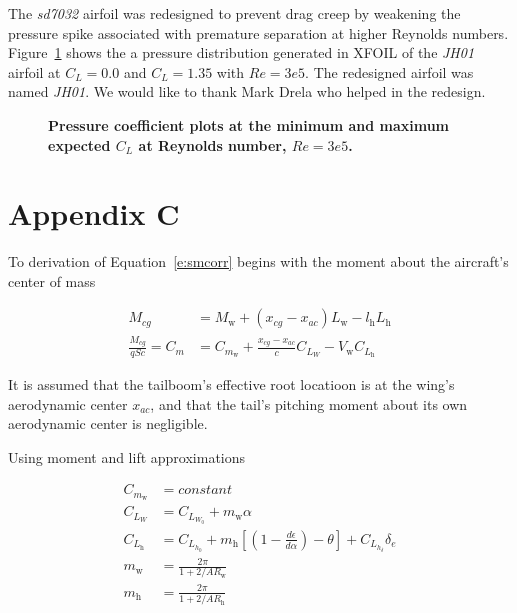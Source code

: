 \documentclass[]{aiaa-tc}%
\begin{document}
The \emph{sd7032} airfoil was redesigned to prevent drag creep by weakening the pressure spike associated with premature separation at higher Reynolds numbers.  
Figure~\ref{f:jhcps} shows the a pressure distribution generated in XFOIL of the \emph{JH01} airfoil at $C_L=0.0$ and $C_L=1.35$ with $Re=3e5$.
The redesigned airfoil was named \emph{JH01}. We would like to thank Mark Drela who helped in the redesign.

\begin{figure}[H]
 \begin{subfigmatrix}{2}%
 \end{subfigmatrix}
 \caption{\textbf{ Pressure coefficient plots at the minimum and maximum expected $C_L$ at Reynolds number, $Re=3e5$.  }}
 \label{f:jhcps}
\end{figure}

\section*{Appendix C}

To derivation of Equation~\eqref{e:smcorr} begins with the moment about the aircraft's center of mass

\begin{align}
    \label{e:mcenter}
    M_{cg} &= M_{\text{w}} + (x_{cg} - x_{ac})L_{\text{w}} - l_{\text{h}} L_{\text{h}} \\
    \label{e:eq6}
    \frac{M_{cg}}{qSc} = C_m &= C_{m_{\text{w}}} + \frac{x_{cg} - x_{ac}}{c} C_{L_W} - V_{\text{w}} C_{L_{\text{h}}}
\end{align}

It is assumed that the tailboom's effective root locatioon is at the wing's aerodynamic center $x_{ac}$, and that the tail's pitching moment about its own aerodynamic center is negligible. 

Using moment and lift approximations

\begin{align}
    C_{m_{\text{w}}} &= constant \\
    C_{L_W} &= C_{L_{W_0}} + m_{\text{w}} \alpha \\
    \label{e:eq10}
    C_{L_{\text{h}}} &= C_{L_{h_0}} + m_{\text{h}} \left[\left( 1 - \frac{d\epsilon}{d\alpha}\right) - \theta \right] + C_{L_{h_{\delta}}}\delta_e \\
    m_{\text{w}} &= \frac{2\pi}{1 + 2/AR_{\text{w}}} \\
    m_{\text{h}} &= \frac{2\pi}{1 + 2/AR_{\text{h}}}
\end{align}
\end{document}
